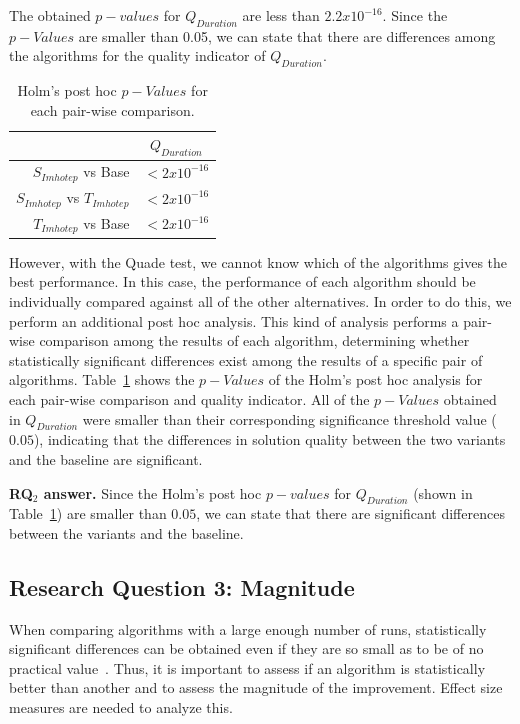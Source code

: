 The obtained $p-values$ for $Q_{Duration}$ are less than $2.2x10^{-16}$. Since the $p-Values$ are smaller than 0.05, we can state that there are differences among the algorithms for the quality indicator of $Q_{Duration}$.

\begin{table}[H]
\centering
\caption{Holm's post hoc $p-Values$ for each pair-wise comparison.}
\label{tab:postHoc}
\begin{tabular}{@{}rc@{}}
\toprule
               & $Q_{Duration}$ \\ \midrule
               $S_{Imhotep}$ vs Base  & $<2x10^{-16}$  \\
               $S_{Imhotep}$ vs $T_{Imhotep}$ & $<2x10^{-16}$  \\
               $T_{Imhotep}$ vs Base  & $<2x10^{-16}$  \\ \bottomrule
\end{tabular}
\end{table}

However, with the Quade test, we cannot know which of the algorithms gives the best performance. In this case, the performance of each algorithm should be individually compared against all of the other alternatives. In order to do this, we perform an additional post hoc analysis. This kind of analysis performs a pair-wise comparison among the results of each algorithm, determining whether statistically significant differences exist among the results of a specific pair of algorithms.
Table~\ref{tab:postHoc} shows the $p-Values$ of the Holm's post hoc analysis for each pair-wise comparison and quality indicator. All of the $p-Values$ obtained in $Q_{Duration}$ were smaller than their corresponding significance threshold value ($0.05$), indicating that the differences in solution quality between the two variants and the baseline are significant.

\textbf{RQ$_2$ answer. }
Since the Holm's post hoc $p-values$ for $Q_{Duration}$ (shown in Table~\ref{tab:postHoc}) are smaller than $0.05$, we can state that there are significant differences between the variants and the baseline.

\subsection{Research Question 3: Magnitude}

When comparing algorithms with a large enough number of runs, statistically significant differences can be obtained even if they are so small as to be of no practical value~\cite{Arcuri2014}. Thus, it is important to assess if an algorithm is statistically better than another and to assess the magnitude of the improvement. Effect size measures are needed to analyze this.

